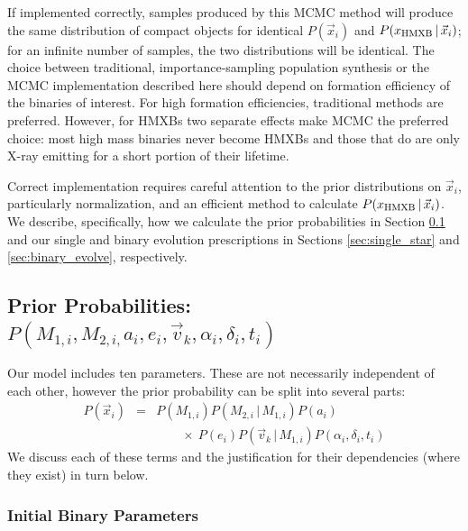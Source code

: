 \documentclass[12pt, preprint]{aastex}
\newcommand{\given}{\,|\,}
\begin{document}
If implemented correctly, samples produced by this MCMC method will produce the same distribution of compact objects for identical $P(\vec{x}_i)$ and $P(x_{\rm HMXB} \given \vec{x}_i)$; for an infinite number of samples, the two distributions will be identical. The choice between traditional, importance-sampling population synthesis or the MCMC implementation described here should depend on formation efficiency of the binaries of interest. For high formation efficiencies, traditional methods are preferred. However, for HMXBs two separate effects make MCMC the preferred choice: most high mass binaries never become HMXBs and those that do are only X-ray emitting for a short portion of their lifetime.


Correct implementation requires careful attention to the prior distributions on $\vec{x}_i$, particularly normalization, and an efficient method to calculate $P(x_{\rm HMXB} \given \vec{x}_i)$. We describe, specifically, how we calculate the prior probabilities in Section \ref{sec:priors} and our single and binary evolution prescriptions in Sections \ref{sec:single_star} and \ref{sec:binary_evolve}, respectively.




\subsection{Prior Probabilities: $P(M_{1,i}, M_{2,i,} a_i, e_i, \vec{v}_k, \alpha_i, \delta_i, t_i)$} \label{sec:priors}

Our model includes ten parameters. These are not necessarily independent of each other, however the prior probability can be split into several parts:
\begin{eqnarray}
P(\vec{x}_i) &=& P(M_{1,i}) P(M_{2,i}\given M_{1,i}) P(a_i) \nonumber \\
 & & \qquad  \times\ P(e_i) P(\vec{v}_k \given M_{1,i}) P(\alpha_i, \delta_i, t_i)
\end{eqnarray}
We discuss each of these terms and the justification for their dependencies (where they exist) in turn below.

\subsubsection{Initial Binary Parameters}
\end{document}
